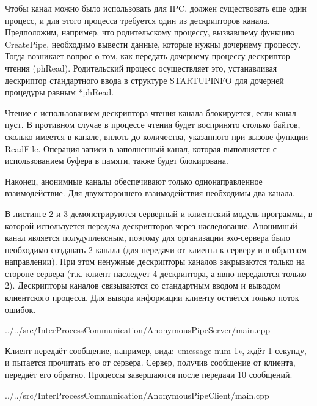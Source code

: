 \documentclass[a4paper, 12pt]{report}		%
\begin{document}
Чтобы канал можно было использовать для IPC, должен существовать еще один процесс, и для этого процесса требуется один из дескрипторов канала. Предположим, например, что родительскому процессу, вызвавшему функцию CreatePipe, необходимо вывести данные, которые нужны дочернему процессу. Тогда возникает вопрос о том, как передать дочернему процессу дескриптор чтения (phRead). Родительский процесс осуществляет это, устанавливая дескриптор стандартного ввода в структуре STARTUPINFO для дочерней процедуры равным *phRead.

Чтение с использованием дескриптора чтения канала блокируется, если канал пуст. В противном случае в процессе чтения будет воспринято столько байтов, сколько имеется в канале, вплоть до количества, указанного при вызове функции ReadFile. Операция записи в заполненный канал, которая выполняется с использованием буфера в памяти, также будет блокирована.

Наконец, анонимные каналы обеспечивают только однонаправленное взаимодействие. Для двухстороннего взаимодействия необходимы два канала.

В листинге 2 и 3 демонстрируются серверный и клиентский модуль программы, в которой используется передача дескрипторов через наследование. Анонимный канал является полудуплексным, поэтому для организации эхо-сервера было необходимо создавать 2 канала (для передачи от клиента к серверу и в обратном направлении). При этом ненужные дескрипторы каналов закрываются только на стороне сервера (т.к. клиент наследует 4 дескриптора, а явно передаются только 2). Дескрипторы каналов связываются со стандартным вводом и выводом клиентского процесса. Для вывода информации клиенту остаётся только поток ошибок\cite{Dushutina}.


{../../src/InterProcessCommunication/AnonymousPipeServer/main.cpp}

Клиент передаёт сообщение, например, вида: «message num 1», ждёт 1 секунду, и пытается прочитать его от сервера. Сервер, получив сообщение от клиента, передаёт его обратно. Процессы завершаются после передачи 10 сообщений.


{../../src/InterProcessCommunication/AnonymousPipeClient/main.cpp}
\end{document}
